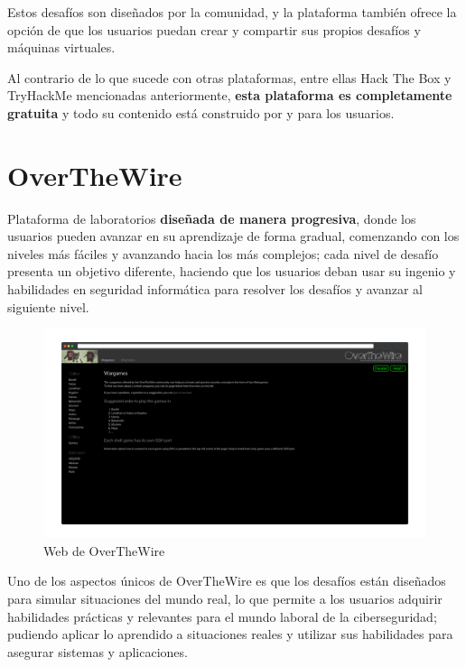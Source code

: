         Estos desafíos son diseñados por la comunidad, y la plataforma también ofrece la opción de que los usuarios puedan crear y compartir sus propios desafíos y máquinas virtuales.
        
        Al contrario de lo que sucede con otras plataformas, entre ellas Hack The Box y TryHackMe mencionadas anteriormente, \textbf{esta plataforma es completamente gratuita} y todo su contenido está construido por y para los usuarios.
        
        \newpage
    
    
    \section{OverTheWire}
    
        Plataforma de laboratorios \textbf{diseñada de manera progresiva}, donde los usuarios pueden avanzar en su aprendizaje de forma gradual, comenzando con los niveles más fáciles y avanzando hacia los más complejos; cada nivel de desafío presenta un objetivo diferente, haciendo que los usuarios deban usar su ingenio y habilidades en seguridad informática para resolver los desafíos y avanzar al siguiente nivel.
        
        \begin{figure}[h]
            \centering

            \includegraphics[width=\textwidth]{images/Capturas/Web de OverTheWire.png}

            \caption{Web de OverTheWire}
            \label{fig:OverTheWire-web}
        \end{figure}
        
        Uno de los aspectos únicos de OverTheWire es que los desafíos están diseñados para simular situaciones del mundo real, lo que permite a los usuarios adquirir habilidades prácticas y relevantes para el mundo laboral de la ciberseguridad; pudiendo aplicar lo aprendido a situaciones reales y utilizar sus habilidades para asegurar sistemas y aplicaciones.
        
